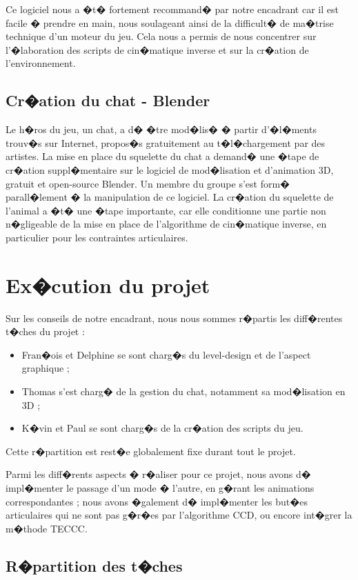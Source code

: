 \documentclass[a4paper,11pt]{article}
\begin{document}
Ce logiciel nous a �t� fortement recommand� par notre encadrant car il est facile � prendre en main, nous soulageant ainsi de la difficult� de ma�trise technique d'un moteur du jeu. Cela nous a permis de nous concentrer sur l'�laboration des scripts de cin�matique inverse et sur la cr�ation de l'environnement.

\subsection{Cr�ation du chat - Blender}

Le h�ros du jeu, un chat, a d� �tre mod�lis� � partir d'�l�ments trouv�s sur Internet, propos�s gratuitement au t�l�chargement par des artistes. La mise en place du squelette du chat a demand� une �tape de cr�ation suppl�mentaire sur le logiciel de mod�lisation et d'animation 3D, gratuit et open-source Blender. Un membre du groupe s'est form� parall�lement � la manipulation de ce logiciel. La cr�ation du squelette de l'animal a �t� une �tape importante, car elle conditionne une partie non n�gligeable de la mise en place de l'algorithme de cin�matique inverse, en particulier pour les contraintes articulaires. 

\section{Ex�cution du projet}
Sur les conseils de notre encadrant, nous nous sommes r�partis les diff�rentes t�ches du projet : 
\begin{itemize}
\item Fran�ois et Delphine se sont charg�s du level-design et de l'aspect graphique ;
\item Thomas s'est charg� de la gestion du chat, notamment sa mod�lisation en 3D ;
\item K�vin et Paul se sont charg�s de la cr�ation des scripts du jeu.
\end{itemize}
Cette r�partition est rest�e globalement fixe durant tout le projet.

Parmi les diff�rents aspects � r�aliser pour ce projet, nous avons d� impl�menter le passage d'un mode � l'autre, en g�rant les animations correspondantes ; nous avons �galement d� impl�menter les but�es articulaires qui ne sont pas g�r�es par l'algorithme CCD, ou encore int�grer la m�thode TECCC. 


\subsection{R�partition des t�ches}
\end{document}
